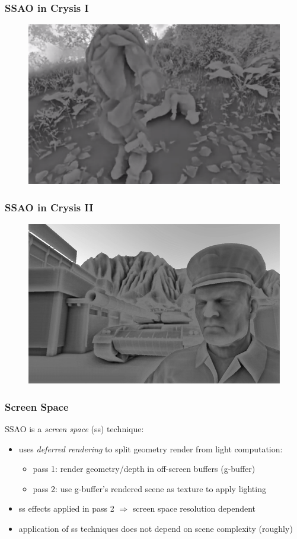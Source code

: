 \documentclass{beamer}
\begin{document}
\begin{frame}
\frametitle{SSAO in Crysis I}
\begin{figure}
    \centering
    \includegraphics[width=0.8\linewidth]{images/ssao_crysis_gameplay.png}
\end{figure}
\end{frame}

\begin{frame}
\frametitle{SSAO in Crysis II}
\begin{figure}
    \centering
    \includegraphics[width=0.8\linewidth]{images/ssao_tank.jpg}
\end{figure}

\end{frame}

\begin{frame}
\frametitle{Screen Space}
SSAO is a \emph{screen space} (ss) technique:
\begin{itemize}
    \item uses \emph{deferred rendering} to split geometry render from light computation:
    \begin{itemize}
        \item pass 1: render geometry/depth in off-screen buffers (g-buffer)
        \item pass 2: use g-buffer's rendered scene as texture to apply lighting
    \end{itemize}
    \item ss effects applied in pass 2 $ \Rightarrow $ screen space resolution dependent
    \item application of ss techniques does not depend on scene complexity (roughly)
\end{itemize}
\end{frame}
\end{document}
